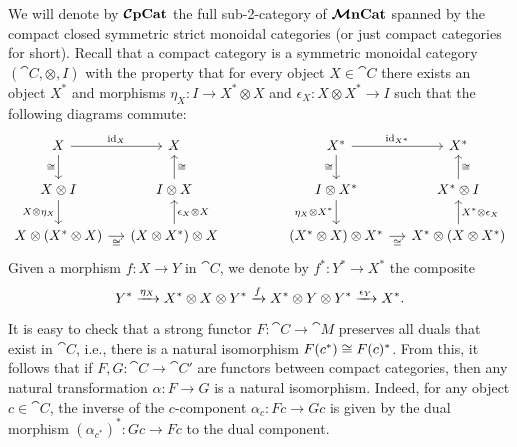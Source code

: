 \documentclass[11pt,oneside,article]{memoir}
\begin{document}
We will denote by $\bm{\mathcal{C}}\mathbf{pCat}$ the full sub-2-category of $\bm{\mathcal{M}}\mathbf{nCat}$ spanned by the compact closed
symmetric strict monoidal categories (or just compact categories for short).  Recall that a compact
category is a symmetric monoidal category $(\cat{C},\otimes,I)$ with the property that for every
object
$X\in\cat{C}$ there exists an object $X^*$ and morphisms $\eta_X\colon I\to X^*\otimes X$ and
$\epsilon_X\colon X\otimes X^*\to I$ such that the following diagrams commute:
\begin{equation*}
   \begin{tikzcd}[column sep=small]
      X\arrow[r,"\id_X"]\arrow[d,"\cong"'] & X \\
      X\otimes I\arrow[d,"X\otimes\eta_X"'] & I\otimes X\arrow[u,"\cong"'] \\
      X\otimes(X^*\otimes X)\arrow[r,"\cong"'] & (X\otimes X^*)\otimes X\arrow[u,"\epsilon_X\otimes X"']
   \end{tikzcd}
   \hspace{.6in}
   \begin{tikzcd}[column sep=small]
      X^*\arrow[r,"\id_{X^*}"]\arrow[d,"\cong"'] & X^*\\
      I\otimes X^*\arrow[d,"\eta_X\otimes X^*"'] & X^*\otimes I\arrow[u,"\cong"'] \\
      (X^*\otimes X)\otimes X^*\arrow[r,"\cong"'] & X^*\otimes (X\otimes X^*)\arrow[u,"X^*\otimes\epsilon_X"']
   \end{tikzcd}
\end{equation*}
Given a morphism $f\colon X\to Y$ in $\cat{C}$, we denote by $f^*\colon Y^*\to X^*$ the composite
$$Y^*\xrightarrow{\eta_X}X^*\otimes X\otimes Y^* \xrightarrow{f}X^*\otimes Y\otimes Y^*\xrightarrow{\epsilon_Y}X^*.$$

It is easy to check that a strong functor $F\colon\cat{C}\to\cat{M}$ preserves all duals that exist in $\cat{C}$, i.e., there is a natural isomorphism $F(c^*)\cong F(c)^*$. From this, it follows that if $F,G\colon\cat{C}\to\cat{C'}$ are functors between compact categories, then any natural transformation $\alpha\colon F\to G$ is a natural isomorphism. Indeed, for any object $c\in\cat{C}$, the inverse of the $c$-component $\alpha_c\colon Fc\to Gc$ is given by the dual morphism $(\alpha_{c^*})^*\colon Gc\to Fc$ to the dual component.
\end{document}
